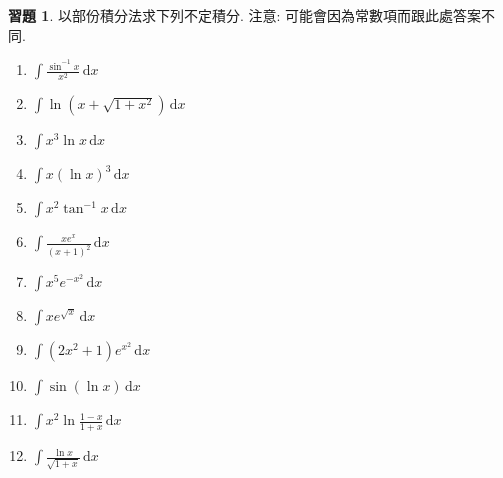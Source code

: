 \documentclass[12pt]{extarticle}
\newcommand{\ds}{\displaystyle}
\theoremstyle{definition}
\newtheorem*{exe}{習題}
\begin{document}
\begin{exe} 以部份積分法求下列不定積分. 注意: 可能會因為常數項而跟此處答案不同.
  \begin{multicols}{3}
    \begin{enumerate}\setlength{\itemsep}{0pt}
      \item $\ds\int\frac{\sin^{-1}x}{x^2}\,\text{d}x $%
      \item $\ds\int\ln(x + \sqrt{1 + x^2})\,\text{d}x $%
      \item $\ds\int x^3\ln x\,\text{d}x $%
      \item $\ds\int x(\ln x)^3\,\text{d}x $%
      \item $\ds\int x^2\tan^{-1} x\,\text{d}x $%
      \item $\ds\int\!\frac{x e^x}{(x + 1)^2}\,\text{d}x $%
      \item $\ds\int x^5 e^{-x^2}\,\text{d}x $%
      \item $\ds\int x e^{\sqrt{x}}\,\text{d}x $%
      \item $\ds\int(2x^2 + 1)e^{x^2}\,\text{d}x$%
      \item $\ds\int\!\sin(\ln x)\,\text{d}x $%
      \item $\ds\int\!x^2\ln\frac{1 - x}{1 + x}\,\text{d}x $%
      \item $\ds\int\!\frac{\ln x}{\sqrt{1 + x}}\,\text{d}x $%
    \end{enumerate}
  \end{multicols}
\end{exe}
\end{document}
